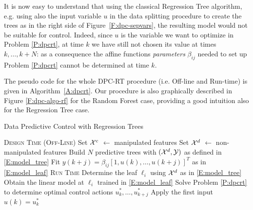 \textcolor[rgb]{0,0,1}{\begin{remark}
It is now easy to understand that using the classical Regression Tree algorithm, e.g. using also the input variable $u$ in the data splitting procedure to create the trees as in the right side of Figure~\ref{F:dpc-sepvars}, the resulting model would not be suitable for control. Indeed, since $u$ is the variable we want to optimize in Problem \ref{P:dpcrt}, at time $k$ we have still not chosen its value at times $k, \ldots, k+N$: as a consequence the affine functions \emph{parameters }$\beta_{ij}$ needed to set up Problem \ref{P:dpcrt} cannot be determined at time $k$.
\end{remark}}


\textcolor[rgb]{0,0,1}{The pseudo code for the whole DPC-RT procedure (i.e. Off-line and Run-time) is given in Algorithm~\ref{A:dpcrt}. Our procedure is also graphically described in Figure \ref{F:dpc-algo-rf} for the Random Forest case, providing a good intuition also for the Regression Tree case.}


\textcolor[rgb]{0,0,1}{\begin{algorithm}[ht!]
	\caption{Data Predictive Control with Regression Trees}
	\label{A:dpcrt}
	\begin{algorithmic}[1]
		\State \textsc{Design Time (Off-Line)}
		\State Set $\mathcal{X}^c$ $\gets$ manipulated features
		\State Set $\mathcal{X}^d$ $\gets$ non-manipulated features
		\State Build $N$ predictive trees with $(\mathcal{X}^d,\mathcal{Y})$ as defined in \eqref{E:model_tree}
		\State Fit $ y(k+j) =  \beta_{ij} \left[1,u(k),\ldots,u(k+j) \right]^T$ as in \eqref{E:model_leaf}
		\EndFor
		\EndFor
		\EndProcedure
		\State \textsc{Run Time}
		\State Determine the leaf $\ell_i$ using $\mathcal{X}^d$ as in \eqref{E:model_tree}
		\State Obtain the linear model at $\ell_i$ trained in \eqref{E:model_leaf}
		\EndFor
		\State Solve Problem \ref{P:dpcrt} to determine optimal
		\State control actions $u^*_k,\ldots,u^*_{k+j}$
		\State Apply the first input $u(k)=u^*_k$
		\EndWhile
		\EndProcedure
	\end{algorithmic}
\end{algorithm}}




